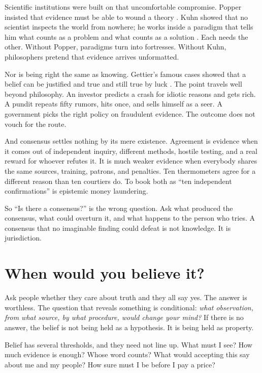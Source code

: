 \documentclass[12pt,a4paper]{book}
\begin{document}
Scientific institutions were built on that uncomfortable compromise. Popper insisted that evidence must be able to wound a theory \cite{popper-en}. Kuhn showed that no scientist inspects the world from nowhere; he works inside a paradigm that tells him what counts as a problem and what counts as a solution \cite{kuhn}. Each needs the other. Without Popper, paradigms turn into fortresses. Without Kuhn, philosophers pretend that evidence arrives unformatted.

Nor is being right the same as knowing. Gettier's famous cases showed that a belief can be justified and true and still true by luck \cite{Gettier1963}. The point travels well beyond philosophy. An investor predicts a crash for idiotic reasons and gets rich. A pundit repeats fifty rumors, hits once, and sells himself as a seer. A government picks the right policy on fraudulent evidence. The outcome does not vouch for the route.

And consensus settles nothing by its mere existence. Agreement is evidence when it comes out of independent inquiry, different methods, hostile testing, and a real reward for whoever refutes it. It is much weaker evidence when everybody shares the same sources, training, patrons, and penalties. Ten thermometers agree for a different reason than ten courtiers do. To book both as ``ten independent confirmations'' is epistemic money laundering.

So ``Is there a consensus?'' is the wrong question. Ask what produced the consensus, what could overturn it, and what happens to the person who tries. A consensus that no imaginable finding could defeat is not knowledge. It is jurisdiction.

\section{When would you believe it?}

Ask people whether they care about truth and they all say yes. The answer is worthless. The question that reveals something is conditional: \emph{what observation, from what source, by what procedure, would change your mind?} If there is no answer, the belief is not being held as a hypothesis. It is being held as property.

Belief has several thresholds, and they need not line up. What must I see? How much evidence is enough? Whose word counts? What would accepting this say about me and my people? How sure must I be before I pay a price?
\end{document}
